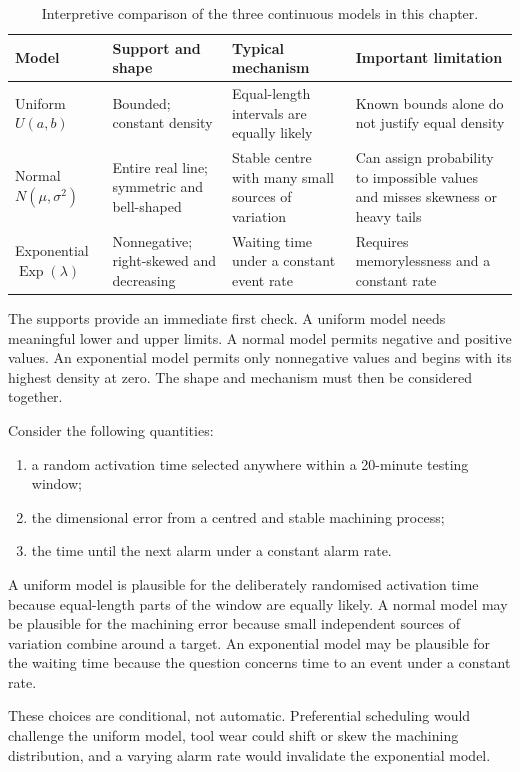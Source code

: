\begin{table}[htbp]
\centering
\caption{Interpretive comparison of the three continuous models in this chapter.}
\label{tab:continuous-model-comparison}
\begin{tabularx}{\textwidth}{@{}l>{\raggedright\arraybackslash}X>{\raggedright\arraybackslash}X>{\raggedright\arraybackslash}X@{}}
\toprule
Model & Support and shape & Typical mechanism & Important limitation \\
\midrule
Uniform $U(a,b)$
& Bounded; constant density
& Equal-length intervals are equally likely
& Known bounds alone do not justify equal density \\
Normal $N(\mu,\sigma^2)$
& Entire real line; symmetric and bell-shaped
& Stable centre with many small sources of variation
& Can assign probability to impossible values and misses skewness or heavy tails \\
Exponential $\operatorname{Exp}(\lambda)$
& Nonnegative; right-skewed and decreasing
& Waiting time under a constant event rate
& Requires memorylessness and a constant rate \\
\bottomrule
\end{tabularx}
\end{table}

The supports provide an immediate first check. A uniform model needs meaningful lower and upper limits. A normal model permits negative and positive values. An exponential model permits only nonnegative values and begins with its highest density at zero. The shape and mechanism must then be considered together.

\begin{example}\par
Consider the following quantities:
\begin{enumerate}
    \item a random activation time selected anywhere within a 20-minute testing window;
    \item the dimensional error from a centred and stable machining process;
    \item the time until the next alarm under a constant alarm rate.
\end{enumerate}
A uniform model is plausible for the deliberately randomised activation time because equal-length parts of the window are equally likely. A normal model may be plausible for the machining error because small independent sources of variation combine around a target. An exponential model may be plausible for the waiting time because the question concerns time to an event under a constant rate.

These choices are conditional, not automatic. Preferential scheduling would challenge the uniform model, tool wear could shift or skew the machining distribution, and a varying alarm rate would invalidate the exponential model.
\end{example}

